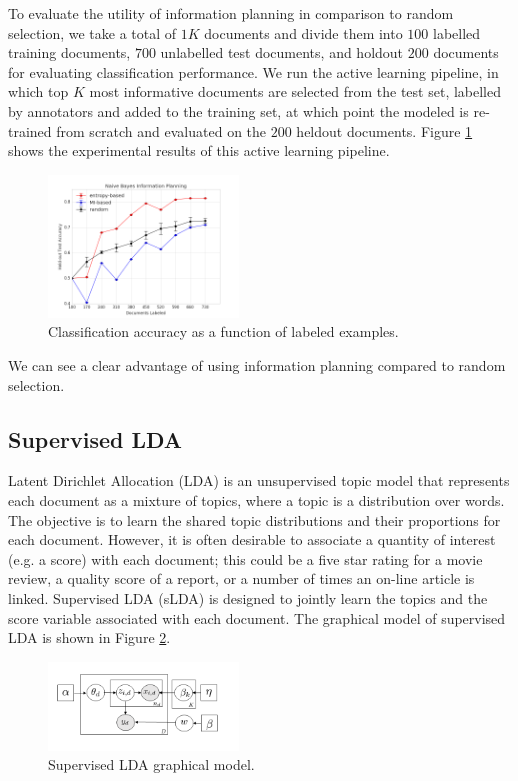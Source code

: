 To evaluate the utility of information planning in comparison to random selection, we take a total of $1K$ documents and divide them into $100$ labelled training documents, $700$ unlabelled test documents, and holdout $200$ documents for evaluating classification performance. We run the active learning pipeline, in which top $K$ most informative documents are selected from the test set, labelled by annotators and added to the training set, at which point the modeled is re-trained from scratch and evaluated on the $200$ heldout documents. Figure \ref{fig:nb_trials_acc} shows the experimental results of this active learning pipeline.
\begin{figure}[h]
    \centering
    \includegraphics[width=0.45\textwidth]{figures/nb_trials_acc.png}
    \caption{Classification accuracy as a function of labeled examples.}
    \label{fig:nb_trials_acc}
\end{figure}
We can see a clear advantage of using information planning compared to random selection.

\subsection{Supervised LDA}

Latent Dirichlet Allocation (LDA) \cite{Blei2003} is an unsupervised topic model that represents each document as a mixture of topics, where a topic is a distribution over words. The objective is to learn the shared topic distributions and their proportions for each document. However, it is often desirable to associate a quantity of interest (e.g. a score) with each document; this could be a five star rating for a movie review, a quality score of a report, or a number of times an on-line article is linked. Supervised LDA (sLDA) \cite{Blei2010} is designed to jointly learn the topics and the score variable associated with each document. The graphical model of supervised LDA is shown in Figure \ref{fig:slda_gm}. 

\begin{figure}[thpb]
    \centering
    \includegraphics[width=0.45\textwidth]{figures/sLDA_gm.png}
    \caption{Supervised LDA \cite{Blei2010} graphical model.}
    \label{fig:slda_gm}
\end{figure}

